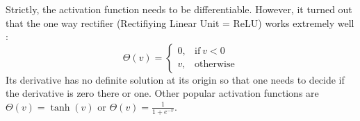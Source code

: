 \documentclass[12pt]{article}
\begin{document}
Strictly, the activation function needs to be differentiable. However,
it turned out that the one way rectifier (Rectifiying Linear Unit = ReLU)
works extremely well \citep{Fukushima1975}:
\begin{equation}
  \Theta(v) =
  \begin{cases}
    0, & \text{if}\ v < 0 \\
    v, & \text{otherwise}
  \end{cases}
\end{equation}
Its derivative has no definite solution at its origin so that one needs
to decide if the derivative is zero there or one.
Other popular activation functions are $\Theta(v)=\tanh(v)$ or $\Theta(v)=\frac{1}{1+e^{-v}}$.



\end{document}
